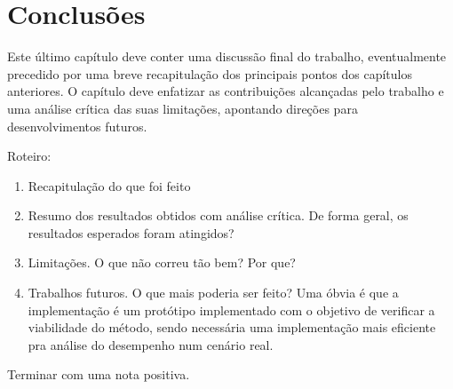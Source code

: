 \documentclass[bsc, oneside, scr, 12pt]{ufpethesis}
\newenvironment{comment}{\itshape\noindent<begin comment -- ommit this in the final version>\par}{\par\noindent<end comment>\rm}
\begin{document}
\chapter{Conclusões}

\begin{comment}
Este último capítulo deve conter uma discussão final do trabalho, eventualmente precedido por uma breve recapitulação dos principais pontos dos capítulos anteriores. O capítulo deve enfatizar as contribuições alcançadas pelo trabalho e uma análise crítica das suas limitações, apontando direções para desenvolvimentos futuros.
\end{comment}

Roteiro:

\begin{enumerate}
\item Recapitulação do que foi feito
\item Resumo dos resultados obtidos com análise crítica. De forma geral, os resultados esperados foram atingidos? 
\item Limitações. O que não correu tão bem? Por que?
\item Trabalhos futuros. O que mais poderia ser feito? Uma óbvia é que a implementação é um protótipo implementado com o objetivo de verificar a viabilidade do método, sendo necessária uma implementação mais eficiente pra análise do desempenho num cenário real.
\end{enumerate}

Terminar com uma nota positiva.




\backmatter

\appendix

% 
% 
% 


\nocite{*}



\colophon

\end{document}
